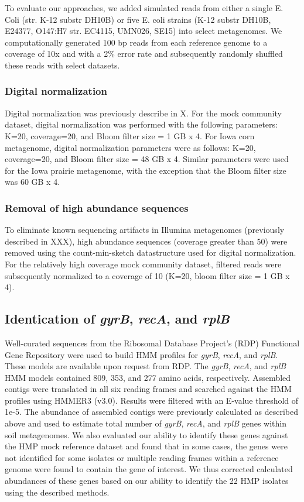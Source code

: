 \documentclass[11pt]{article} %
\begin{document}
To evaluate our approaches, we added simulated reads from either a single E. Coli (str. K-12 substr DH10B) or five E. coli strains (K-12 substr DH10B, E24377, O147:H7 str. EC4115, UMN026, SE15) into select metagenomes.  We computationally generated 100 bp reads from each reference genome to a coverage of 10x and with a 2\% error rate and subsequently randomly shuffled these reads with select datasets.


\subsubsection{Digital normalization}
Digital normalization was previously describe in X.  For the mock community dataset, digital normalization was performed with the following parameters:  K=20, coverage=20, and Bloom filter size = 1 GB x 4.  For Iowa corn metagenome, digital normalization parameters were as follows:  K=20, coverage=20, and Bloom filter size = 48 GB x 4.  Similar parameters were used for the Iowa prairie metagenome, with the exception that the Bloom filter size was 60 GB x 4.

\subsubsection{Removal of high abundance sequences}
To eliminate known sequencing artifacts in Illumina metagenomes (previously described in XXX), high abundance sequences (coverage greater than 50) were removed using the count-min-sketch datastructure used for digital normalization.  For the relatively high coverage mock community dataset, filtered reads were subsequently normalized to a coverage of 10 (K=20, bloom filter size = 1 GB x 4).  

\subsection{Identication of \emph{gyrB}, \emph{recA}, and \emph{rplB}}
Well-curated sequences from the Ribosomal Database Project's (RDP) Functional Gene Repository were used to build HMM profiles for \emph{gyrB}, \emph{recA}, and \emph{rplB}.  These models are available upon request from RDP.  The \emph{gyrB}, \emph{recA}, and \emph{rplB} HMM models contained 809, 353, and 277 amino acids, respectively.  Assembled contigs were translated in all six reading frames and searched against the HMM profiles using HMMER3 (v3.0).  Results were filtered with an E-value threshold of 1e-5.  The abundance of assembled contigs were previously calculated as described above and used to estimate total number of \emph{gyrB}, \emph{recA}, and \emph{rplB} genes within soil metagenomes.  We also evaluated our ability to identify these genes against the HMP mock reference dataset and found that in some cases, the genes were not identified for some isolates or multiple reading frames within a reference genome were found to contain the gene of interest.  We thus corrected calculated abundances of these genes based on our ability to identify the 22 HMP isolates using the described methods.  
\end{document}
